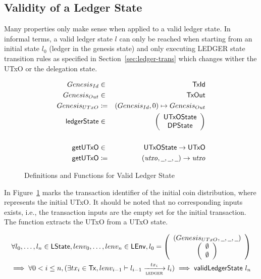 \subsection{Validity of a Ledger State}
\label{sec:valid-ledg-state}

Many properties only make sense when applied to a valid ledger state. In
informal terms, a valid ledger state $l$ can only be reached when starting from
an initial state $l_{0}$ (ledger in the genesis state) and only executing LEDGER
state transition rules as specified in Section~\ref{sec:ledger-trans} which
changes wither the  UTxO or the delegation state.

\begin{figure}[ht]
  \centering
  \begin{align*}
    \genesisId & \in & \TxId \\
    \genesisTxOut & \in & \TxOut \\
    \genesisUTxO & \coloneqq & (\genesisId, 0) \mapsto \genesisTxOut
    \\
    \ledgerState & \in & \left(
                         \begin{array}{c}
                           \UTxOState \\
                           \DPState
                         \end{array}
    \right)\\
               && \\
    \fun{getUTxO} & \in & \UTxOState \to \UTxO \\
    \fun{getUTxO} & \coloneqq & (\var{utxo}, \wcard, \wcard, \wcard) \to \var{utxo}
  \end{align*}
  \caption{Definitions and Functions for Valid Ledger State}
  \label{fig:valid-ledger}
\end{figure}

In Figure~\ref{fig:valid-ledger} \genesisId{} marks the transaction identifier
of the initial coin distribution, where \genesisTxOut{} represents the initial
UTxO. It should be noted that no corresponding inputs exists, i.e., the
transaction inputs are the empty set for the initial transaction. The function
 extracts the UTxO from a UTxO state.

\begin{definition}
  \begin{multline*}
    \forall l_{0},\ldots,l_{n} \in \LState, lenv_{0},\ldots,lenv_{n} \in \LEnv,
    l_{0} = \left(
      \begin{array}{c}
        \genesisUTxOState \\
        \left(
        \begin{array}{c}
          \emptyset\\
          \emptyset
        \end{array}
        \right)
      \end{array}
    \right)  \\
    \implies \forall 0 < i \leq n, (\exists tx_{i} \in \Tx,
    lenv_{i-1}\vdash l_{i-1} \trans{ledger}{tx_{i}} l_{i}) \implies
    \applyFun{validLedgerState} l_{n}
  \end{multline*}
  \label{def:valid-ledger-state}
\end{definition}

